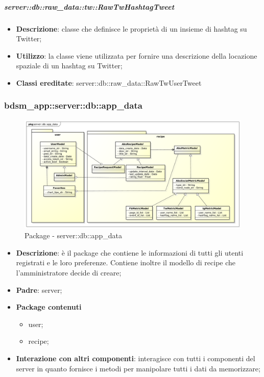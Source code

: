 		\subparagraph{server::db::raw\_data::tw::RawTwHashtagTweet} %
		\label{subp:server_db_raw_data_tw_rawtwhashtagtweet}
			\begin{itemize}
				\item \textbf{Descrizione}: classe che definisce le proprietà di un insieme di hashtag su Twitter;
				\item \textbf{Utilizzo}: la classe viene utilizzata per fornire una descrizione della locazione spaziale di un hashtag su Twitter;
				\item \textbf{Classi ereditate}: server::db::raw\_data::RawTwUserTweet
			\end{itemize}











\subsubsection{bdsm\_app::server::db::app\_data} %
\label{ssub:bdsm_app_server_app_data}


	\begin{figure}[htbp]
		\centering
		\centerline{\includegraphics[scale=0.38]{./images/server/app_data.pdf}}
		\caption{Package - server::db::app\_data}
	\end{figure}


	\begin{itemize}
		\item \textbf{Descrizione}: è il package che contiene le informazioni di tutti gli utenti registrati e le loro preferenze. Contiene inoltre il modello di recipe che l'amministratore decide di creare;
		\item \textbf{Padre}: server;
		\item \textbf{Package contenuti}
			\begin{itemize}
				\item user;
				\item recipe;
			\end{itemize}
		\item \textbf{Interazione con altri componenti}: interagisce con tutti i componenti del server in quanto fornisce i metodi per manipolare tutti i dati da memorizzare;
	\end{itemize}


